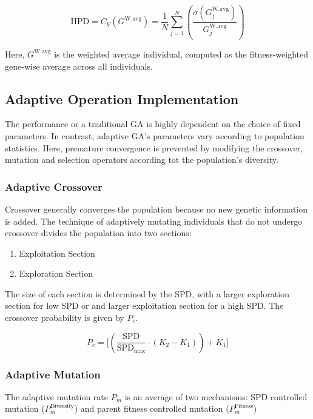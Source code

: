 \documentclass[../main.tex]{subfiles}
\begin{document}
\begin{equation}
\text{HPD} = C_V(G^{\text{W.avg}}) = \frac{1}{N} \sum_{j=1}^N \left( \frac{\sigma (G^{\text{W.avg}}_j)}{G^{\text{W.avg}}_j} \right)
\end{equation}

Here, $G^{\text{W.avg}}$ is the weighted average individual, computed as the fitness-weighted gene-wise average across all individuals.

\subsection{Adaptive Operation Implementation}

The performance or a traditional GA is highly dependent on the choice of fixed parameters. In contrast, adaptive GA's parameters vary according to population statistics. Here, premature convergence is prevented by modifying the crossover, mutation and selection operators according tot the population's diversity.

\subsubsection{Adaptive Crossover}

Crossover generally converges the population because no new genetic information is  added. The technique of adaptively mutating individuals that do not undergo crossover divides the population into two sections:

\begin{enumerate}
	\item Exploitation Section
	\item Exploration Section
\end{enumerate}

The size of each section is determined by the SPD, with a larger exploration section for low SPD or and larger exploitation section for a high SPD. The crossover probability is given by $P_c$.

\begin{equation}
P_c = \bigg[ \left( \frac{\text{SPD}}{\text{SPD}_\text{max}} \cdot (K_2 - K_1) \right) + K_1 \bigg]
\end{equation}

\subsubsection{Adaptive Mutation}
The adaptive mutation rate $P_m$ is an average of two mechanisms: SPD controlled mutation ($P_m^{\text{Diversity}}$) and parent fitness controlled mutation ($P_m^{\text{Fitness}}$)
\end{document}
